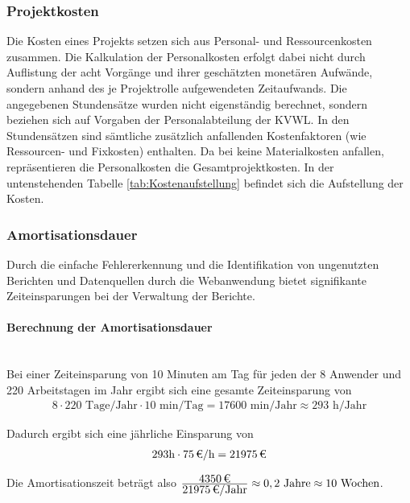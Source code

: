 \subsubsection{Projektkosten}
\label{sec:Projektkosten}
Die Kosten eines Projekts setzen sich aus Personal- und Ressourcenkosten zusammen. Die Kalkulation der Personalkosten erfolgt dabei nicht durch Auflistung der acht Vorgänge und ihrer geschätzten monetären Aufwände, sondern anhand des je Projektrolle aufgewendeten Zeitaufwands. Die angegebenen Stundensätze wurden nicht eigenständig berechnet, sondern beziehen sich auf Vorgaben der Personalabteilung der \ac{KVWL}. In den Stundensätzen sind sämtliche zusätzlich anfallenden Kostenfaktoren (wie Ressourcen- und Fixkosten) enthalten. Da bei \projektName keine Materialkosten anfallen, repräsentieren die Personalkosten die Gesamtprojektkosten. In der untenstehenden Tabelle \ref{tab:Kostenaufstellung} befindet sich die Aufstellung der Kosten.

\subsubsection{Amortisationsdauer}
\label{sec:Amortisationsdauer}
Durch die einfache Fehlererkennung und die Identifikation von ungenutzten Berichten und Datenquellen durch die Webanwendung bietet \projektName signifikante Zeiteinsparungen bei der Verwaltung der Berichte.

\paragraph{Berechnung der Amortisationsdauer} ~\\
Bei einer Zeiteinsparung von 10 Minuten am Tag für jeden der 8 Anwender und 220 Arbeitstagen im Jahr ergibt sich eine gesamte Zeiteinsparung von 
\begin{eqnarray}
8 \cdot 220 \mbox{ Tage/Jahr} \cdot 10 \mbox{ min/Tag} = 17600 \mbox{ min/Jahr} \approx 293 \mbox{ h/Jahr} 
\end{eqnarray}

Dadurch ergibt sich eine jährliche Einsparung von 
\begin{eqnarray}
293 \mbox{h} \cdot \eur{75}{\mbox{/h}} = \eur{21975}
\end{eqnarray}

Die Amortisationszeit beträgt also $\frac{\eur{4350}}{\eur{21975}\mbox{/Jahr}} \approx 0,2 \mbox{ Jahre} \approx 10 \mbox{ Wochen}$.

